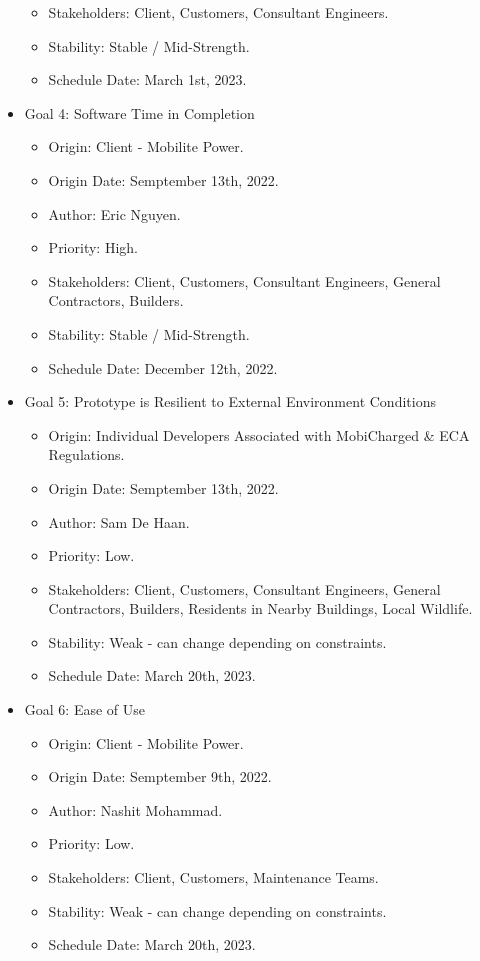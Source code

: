\documentclass[12pt, titlepage]{article}
\begin{document}
\begin{itemize}
\begin{itemize}
        \item Stakeholders: Client, Customers, Consultant Engineers.
        \item Stability: Stable / Mid-Strength.
        \item Schedule Date: March 1st, 2023.
    \end{itemize}
    \item Goal 4: Software Time in Completion
    \begin{itemize}
        \item Origin: Client - Mobilite Power.
        \item Origin Date: Semptember 13th, 2022.
        \item Author: Eric Nguyen.
        \item Priority: High.
        \item Stakeholders: Client, Customers, Consultant Engineers, General Contractors, Builders.
        \item Stability: Stable / Mid-Strength.
        \item Schedule Date: December 12th, 2022.
    \end{itemize}
    \item Goal 5: Prototype is Resilient to External Environment Conditions
    \begin{itemize}
        \item Origin: Individual Developers Associated with MobiCharged \& ECA Regulations.
        \item Origin Date: Semptember 13th, 2022.
        \item Author: Sam De Haan.
        \item Priority: Low.
        \item Stakeholders: Client, Customers, Consultant Engineers, General Contractors, Builders, Residents in Nearby Buildings, Local Wildlife.
        \item Stability: Weak - can change depending on constraints.
        \item Schedule Date: March 20th, 2023.
    \end{itemize}
    \item Goal 6: Ease of Use
    \begin{itemize}
        \item Origin: Client - Mobilite Power.
        \item Origin Date: Semptember 9th, 2022.
        \item Author: Nashit Mohammad.
        \item Priority: Low.
        \item Stakeholders: Client, Customers, Maintenance Teams.
        \item Stability: Weak - can change depending on constraints.
        \item Schedule Date: March 20th, 2023.
    \end{itemize}

\end{itemize}
\end{document}
